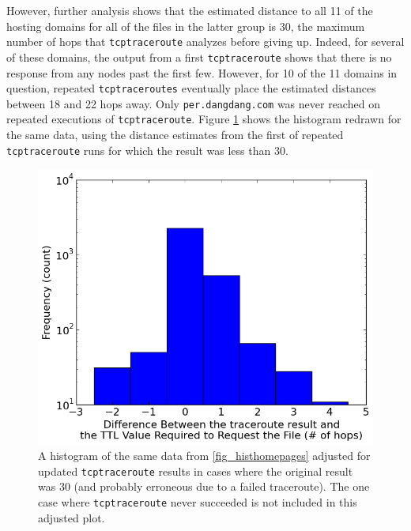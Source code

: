 However, further analysis shows that the estimated distance to all 11 of the hosting domains for all of the files in the latter group is 30, the maximum number of hops that \texttt{tcptraceroute} analyzes before giving up.
Indeed, for several of these domains, the output from a first \texttt{tcptraceroute} shows that there is no response from any nodes past the first few.
However, for 10 of the 11 domains in question, repeated \texttt{tcptraceroutes} eventually place the estimated distances between 18 and 22 hops away.
Only \texttt{per.dangdang.com} was never reached on repeated executions of \texttt{tcptraceroute}.
Figure \ref{fig_histhomepages-mod} shows the histogram redrawn for the same data, using the distance estimates from the first of repeated \texttt{tcptraceroute} runs for which the result was less than 30.
\begin{figure}
	\includegraphics[width=\columnwidth]{figures/histhomepages-mod}
	\caption{
		A histogram of the same data from \ref{fig_histhomepages} adjusted for updated \texttt{tcptraceroute} results in cases where the original result was 30 (and probably erroneous due to a failed traceroute).
		The one case where \texttt{tcptraceroute} never succeeded is not included in this adjusted plot.
	}
	\label{fig_histhomepages-mod}
\end{figure}

